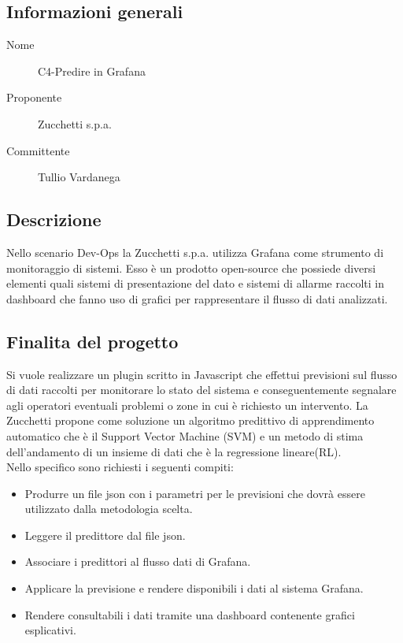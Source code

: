 \documentclass[../studio-di-fattibilita.tex]{subfiles}
\begin{document}
	\subsection{Informazioni generali}
	\label{subsec:informazioni_generali}
	\begin{description}
		\item[Nome] C4-Predire in Grafana
		\item[Proponente] Zucchetti s.p.a.
		\item[Committente] Tullio Vardanega
	\end{description}
	\subsection{Descrizione}
	\label{subsec:descrizione}
	Nello scenario Dev-Ops la Zucchetti s.p.a. utilizza Grafana come strumento di monitoraggio di sistemi. Esso è un prodotto open-source che possiede diversi elementi quali sistemi di presentazione del dato e sistemi di allarme raccolti in dashboard che fanno uso di grafici per rappresentare il flusso di dati analizzati.
	
	\subsection{Finalita del progetto}
	\label{subsec:finalita_del_progetto}
	Si vuole realizzare un plugin scritto in Javascript che effettui previsioni sul flusso di dati raccolti per monitorare lo stato del sistema e conseguentemente segnalare agli operatori eventuali problemi o zone in cui è richiesto un intervento. La Zucchetti propone come soluzione un algoritmo predittivo di apprendimento automatico che è il Support Vector Machine (SVM) e un metodo di stima dell'andamento di un insieme di dati che è la regressione lineare(RL).
	\\
	Nello specifico sono richiesti i seguenti compiti:
	\begin{itemize}
		\item Produrre un file json con i parametri per le previsioni che dovrà essere utilizzato dalla metodologia scelta.
		\item Leggere il predittore dal file json.
		\item Associare i predittori al flusso dati di Grafana.
		\item Applicare la previsione e rendere disponibili i dati al sistema Grafana.
		\item Rendere consultabili i dati tramite una dashboard contenente grafici esplicativi.
	\end{itemize}
	
\end{document}
